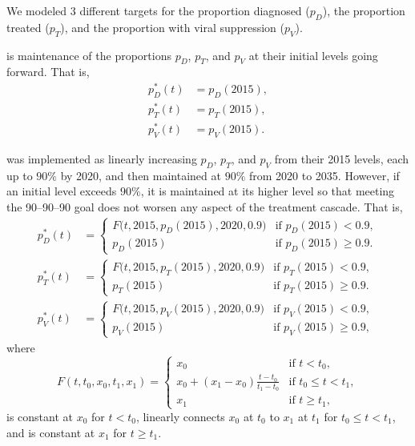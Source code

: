 \documentclass{article}
\begin{document}
We modeled 3 different targets for the proportion diagnosed ($p_D$), the
proportion treated ($p_T$), and the proportion with viral suppression ($p_V$).
\begin{description}[labelsep=0.6ex]
\item[Status quo] is maintenance of the proportions $p_D$, $p_T$, and
  $p_V$ at their initial levels going forward.  That is,
  \begin{equation}
    \label{status_quo_target}
    \begin{split}
      p_D^*(t) &= p_D(2015), \\
      p_T^*(t) &= p_T(2015), \\
      p_V^*(t) &= p_V(2015).
    \end{split}
  \end{equation}

\item[UNAIDS 90--90--90] was implemented as linearly increasing $p_D$,
  $p_T$, and $p_V$ from their 2015 levels, each up to $90\%$ by 2020,
  and then maintained at $90\%$ from 2020 to 2035.  However, if an
  initial level exceeds $90\%$, it is maintained at its higher level
  so that meeting the 90--90--90 goal does not worsen any aspect of
  the treatment cascade.  That is,
  \begin{equation}
    \label{unaids90_targets}
    \begin{split}
      p_D^*(t) &=
      \begin{cases}
        F\big(t, 2015, p_D(2015), 2020, 0.9\big)
        & \text{if $p_D(2015) < 0.9$},
        \\
        p_D(2015) & \text{if $p_D(2015) \geq 0.9$}.
      \end{cases}
      \\
      p_T^*(t) &=
      \begin{cases}
        F\big(t, 2015, p_T(2015), 2020, 0.9\big)
        & \text{if $p_T(2015) < 0.9$},
        \\
        p_T(2015) & \text{if $p_T(2015) \geq 0.9$}.
      \end{cases}
      \\
      p_V^*(t) &=
      \begin{cases}
        F\big(t, 2015, p_V(2015), 2020, 0.9\big)
        & \text{if $p_V(2015) < 0.9$},
        \\
        p_V(2015) & \text{if $p_V(2015) \geq 0.9$},
      \end{cases}
    \end{split}
  \end{equation}
  where
  \begin{equation}
    \label{F}
    F(t, t_0, x_0, t_1, x_1) =
    \begin{cases}
      x_0 & \text{if $t < t_0$},
      \\
      x_0 + (x_1 - x_0) \frac{t - t_0}{t_1 - t_0} &
      \text{if $t_0 \leq t < t_1$},
      \\
      x_1 & \text{if $t \geq t_1$},
    \end{cases}
  \end{equation}
  is constant at $x_0$ for $t < t_0$, linearly connects $x_0$ at
  $t_0$ to $x_1$ at $t_1$ for $t_0 \leq t < t_1$, and is constant at
  $x_1$ for $t \geq t_1$.


\end{description}
\end{document}
